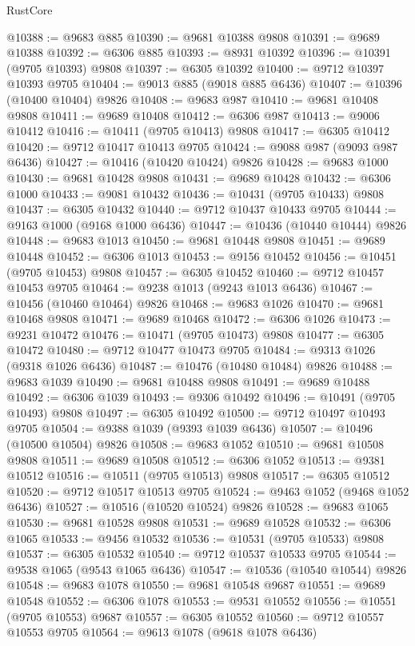 \begin{lexlean}{RustCore}
\begin{coremodule}
@10388 := @9683 @885
@10390 := @9681 @10388 @9808
@10391 := @9689 @10388
@10392 := @6306 @885
@10393 := @8931 @10392
@10396 := @10391 (@9705 @10393) @9808
@10397 := @6305 @10392
@10400 := @9712 @10397 @10393 @9705
@10404 := @9013 @885 (@9018 @885 @6436)
@10407 := @10396 (@10400 @10404) @9826
@10408 := @9683 @987
@10410 := @9681 @10408 @9808
@10411 := @9689 @10408
@10412 := @6306 @987
@10413 := @9006 @10412
@10416 := @10411 (@9705 @10413) @9808
@10417 := @6305 @10412
@10420 := @9712 @10417 @10413 @9705
@10424 := @9088 @987 (@9093 @987 @6436)
@10427 := @10416 (@10420 @10424) @9826
@10428 := @9683 @1000
@10430 := @9681 @10428 @9808
@10431 := @9689 @10428
@10432 := @6306 @1000
@10433 := @9081 @10432
@10436 := @10431 (@9705 @10433) @9808
@10437 := @6305 @10432
@10440 := @9712 @10437 @10433 @9705
@10444 := @9163 @1000 (@9168 @1000 @6436)
@10447 := @10436 (@10440 @10444) @9826
@10448 := @9683 @1013
@10450 := @9681 @10448 @9808
@10451 := @9689 @10448
@10452 := @6306 @1013
@10453 := @9156 @10452
@10456 := @10451 (@9705 @10453) @9808
@10457 := @6305 @10452
@10460 := @9712 @10457 @10453 @9705
@10464 := @9238 @1013 (@9243 @1013 @6436)
@10467 := @10456 (@10460 @10464) @9826
@10468 := @9683 @1026
@10470 := @9681 @10468 @9808
@10471 := @9689 @10468
@10472 := @6306 @1026
@10473 := @9231 @10472
@10476 := @10471 (@9705 @10473) @9808
@10477 := @6305 @10472
@10480 := @9712 @10477 @10473 @9705
@10484 := @9313 @1026 (@9318 @1026 @6436)
@10487 := @10476 (@10480 @10484) @9826
@10488 := @9683 @1039
@10490 := @9681 @10488 @9808
@10491 := @9689 @10488
@10492 := @6306 @1039
@10493 := @9306 @10492
@10496 := @10491 (@9705 @10493) @9808
@10497 := @6305 @10492
@10500 := @9712 @10497 @10493 @9705
@10504 := @9388 @1039 (@9393 @1039 @6436)
@10507 := @10496 (@10500 @10504) @9826
@10508 := @9683 @1052
@10510 := @9681 @10508 @9808
@10511 := @9689 @10508
@10512 := @6306 @1052
@10513 := @9381 @10512
@10516 := @10511 (@9705 @10513) @9808
@10517 := @6305 @10512
@10520 := @9712 @10517 @10513 @9705
@10524 := @9463 @1052 (@9468 @1052 @6436)
@10527 := @10516 (@10520 @10524) @9826
@10528 := @9683 @1065
@10530 := @9681 @10528 @9808
@10531 := @9689 @10528
@10532 := @6306 @1065
@10533 := @9456 @10532
@10536 := @10531 (@9705 @10533) @9808
@10537 := @6305 @10532
@10540 := @9712 @10537 @10533 @9705
@10544 := @9538 @1065 (@9543 @1065 @6436)
@10547 := @10536 (@10540 @10544) @9826
@10548 := @9683 @1078
@10550 := @9681 @10548 @9687
@10551 := @9689 @10548
@10552 := @6306 @1078
@10553 := @9531 @10552
@10556 := @10551 (@9705 @10553) @9687
@10557 := @6305 @10552
@10560 := @9712 @10557 @10553 @9705
@10564 := @9613 @1078 (@9618 @1078 @6436)

\end{coremodule}
\end{lexlean}
